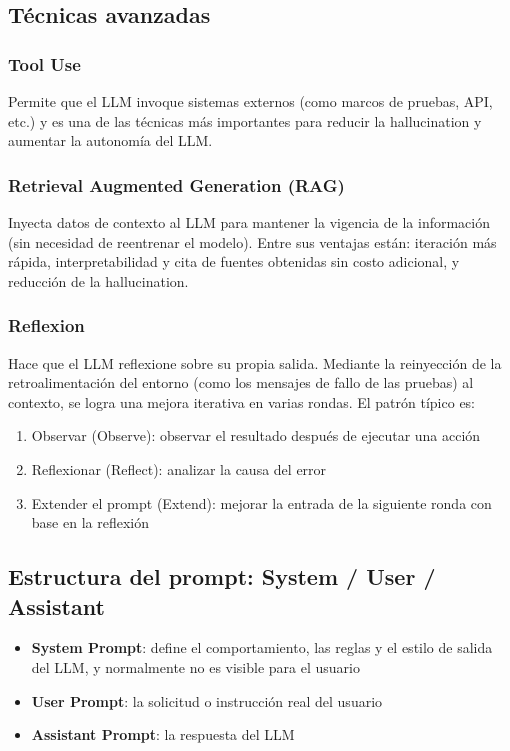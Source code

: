 \documentclass[a4paper]{article}
\begin{document}
\subsection{Técnicas avanzadas}

\subsubsection{Tool Use}

Permite que el LLM invoque sistemas externos (como marcos de pruebas, API, etc.) y es una de las técnicas más importantes para reducir la hallucination y aumentar la autonomía del LLM.

\subsubsection{Retrieval Augmented Generation (RAG)}

Inyecta datos de contexto al LLM para mantener la vigencia de la información (sin necesidad de reentrenar el modelo). Entre sus ventajas están: iteración más rápida, interpretabilidad y cita de fuentes obtenidas sin costo adicional, y reducción de la hallucination.

\subsubsection{Reflexion}

Hace que el LLM reflexione sobre su propia salida. Mediante la reinyección de la retroalimentación del entorno (como los mensajes de fallo de las pruebas) al contexto, se logra una mejora iterativa en varias rondas. El patrón típico es:
\begin{enumerate}
    \item Observar (Observe): observar el resultado después de ejecutar una acción
    \item Reflexionar (Reflect): analizar la causa del error
    \item Extender el prompt (Extend): mejorar la entrada de la siguiente ronda con base en la reflexión
\end{enumerate}

\subsection{Estructura del prompt: System / User / Assistant}

\begin{itemize}
    \item \textbf{System Prompt}: define el comportamiento, las reglas y el estilo de salida del LLM, y normalmente no es visible para el usuario
    \item \textbf{User Prompt}: la solicitud o instrucción real del usuario
    \item \textbf{Assistant Prompt}: la respuesta del LLM
\end{itemize}
\end{document}
